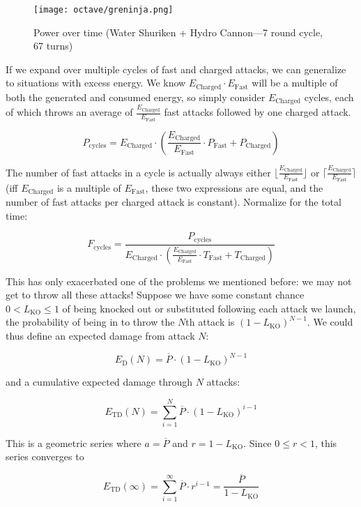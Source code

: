 \begin{figure}[ht]
  \centering
  \texttt{[image: octave/greninja.png]}
  \caption[Power over time]{Power over time (Water Shuriken + Hydro Cannon---7 round cycle, 67 turns)}
\end{figure}

If we expand over multiple cycles of fast and charged attacks, we can
 generalize to situations with excess energy. We know $E_\mathrm{Charged} \cdot
 E_\mathrm{Fast}$ will be a multiple of both the generated and consumed energy, so
 simply consider $E_\mathrm{Charged}$ cycles, each of which throws an average of
 $\frac{E_\mathrm{Charged}}{E_\mathrm{Fast}}$ fast attacks followed by one charged attack.

\[ P_\mathrm{cycles} = E_\mathrm{Charged} \cdot \left(\frac{E_\mathrm{Charged}}{E_\mathrm{Fast}} \cdot P_\mathrm{Fast} + P_\mathrm{Charged}\right) \]

The number of fast attacks in a cycle is actually always either
 $\lfloor\frac{E_\mathrm{Charged}}{E_\mathrm{Fast}}\rfloor$
 or $\lceil\frac{E_\mathrm{Charged}}{E_\mathrm{Fast}}\rceil$ (iff $E_\mathrm{Charged}$ is a multiple of
 $E_\mathrm{Fast}$, these two expressions are equal, and the number of fast attacks
 per charged attack is constant). Normalize for the total time:

\[ F_\mathrm{cycles} = \frac{P_\mathrm{cycles}}{E_\mathrm{Charged} \cdot \left(\frac{E_\mathrm{Charged}}{E_\mathrm{Fast}} \cdot T_\mathrm{Fast} + T_\mathrm{Charged}\right)} \]

This has only exacerbated one of the problems we mentioned before: we may
  not get to throw all these attacks!
Suppose we have some constant chance $0 < L_\mathrm{KO} \leq 1$ of being knocked out or
 substituted following each attack we launch, the probability of being
 in to throw the $N$th attack is $(1 - L_\mathrm{KO})^{N-1}$.
We could thus define an expected damage from attack $N$:

\[ E_\mathrm{D}(N) = \overline{P} \cdot (1 - L_\mathrm{KO})^{N-1} \]

and a cumulative expected damage through $N$ attacks:

\[ E_\mathrm{TD}(N) = \sum^N_{i=1} \overline{P} \cdot (1 - L_\mathrm{KO})^{i-1} \]

This is a geometric series where $a = \overline{P}$ and $r = 1 - L_\mathrm{KO}$.
Since $0 \leq r < 1$, this series converges to

\[ E_\mathrm{TD}(\infty) = \sum^\infty_{i=1} \overline{P} \cdot r^{i-1} = \frac{\overline{P}}{1 - L_\mathrm{KO}} \]


